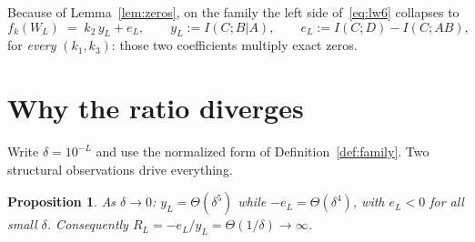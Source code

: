 \documentclass[11pt]{article}
\newtheorem{proposition}[theorem]{Proposition}
\theoremstyle{remark}
\newcommand{\I}{\mathrel{;}}
\begin{document}
Because of Lemma~\ref{lem:zeros}, on the family the left side of~\eqref{eq:lw6} collapses
to
\begin{equation}\label{eq:collapse}
f_k(W_L) \;=\; k_2\, y_L + e_L,
\qquad y_L := I(C\I B|A),\qquad e_L := I(C\I D)-I(C\I AB),
\end{equation}
for \emph{every} $(k_1,k_3)$: those two coefficients multiply exact zeros.

\section{Why the ratio diverges}

Write $\delta=10^{-L}$ and use the normalized form of Definition~\ref{def:family}.
Two structural observations drive everything.

\begin{proposition}\label{prop:asym}
As $\delta\to 0$: $y_L=\Theta(\delta^{5})$ while $-e_L=\Theta(\delta^{4})$, with $e_L<0$
for all small $\delta$. Consequently $R_L=-e_L/y_L=\Theta(1/\delta)\to\infty$.
\end{proposition}
\end{document}
